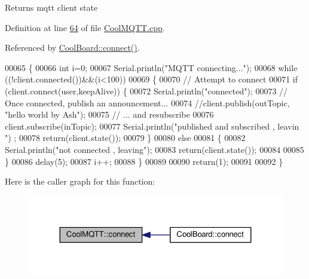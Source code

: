 \begin{DoxyReturn}{Returns}
mqtt client state 
\end{DoxyReturn}


Definition at line \hyperlink{_cool_m_q_t_t_8cpp_source_l00064}{64} of file \hyperlink{_cool_m_q_t_t_8cpp_source}{Cool\+M\+Q\+T\+T.\+cpp}.



Referenced by \hyperlink{_cool_board_8cpp_source_l00071}{Cool\+Board\+::connect()}.


\begin{DoxyCode}
00065 \{       
00066     \textcolor{keywordtype}{int} i=0;
00067     Serial.println(\textcolor{stringliteral}{"MQTT connecting..."});
00068     \textcolor{keywordflow}{while} ((!client.connected())&&(i<100)) 
00069     \{
00070         \textcolor{comment}{// Attempt to connect}
00071         \textcolor{keywordflow}{if} (client.connect(user,keepAlive)) \{
00072             Serial.println(\textcolor{stringliteral}{"connected"});
00073             \textcolor{comment}{// Once connected, publish an announcement...}
00074             \textcolor{comment}{//client.publish(outTopic, "hello world by Ash");}
00075             \textcolor{comment}{// ... and resubscribe}
00076             client.subscribe(inTopic);
00077             Serial.println(\textcolor{stringliteral}{"published and subscribed , leavin "}) ;
00078             \textcolor{keywordflow}{return}(client.state());
00079         \}
00080         \textcolor{keywordflow}{else}
00081         \{
00082             Serial.println(\textcolor{stringliteral}{"not connected , leaving"});
00083             \textcolor{keywordflow}{return}(client.state());
00084             
00085         \}
00086     delay(5);
00087     i++;
00088     \}
00089     
00090     \textcolor{keywordflow}{return}(1);
00091 
00092 \}
\end{DoxyCode}
Here is the caller graph for this function\+:
\nopagebreak
\begin{figure}[H]
\begin{center}
\leavevmode
\includegraphics[width=324pt]{class_cool_m_q_t_t_a58b0b1f64b269c2681685208262fba1d_icgraph}
\end{center}
\end{figure}
\mbox{\label{class_cool_m_q_t_t_a373cc92fca7760d886f02d8a6e5b3f63}} 
